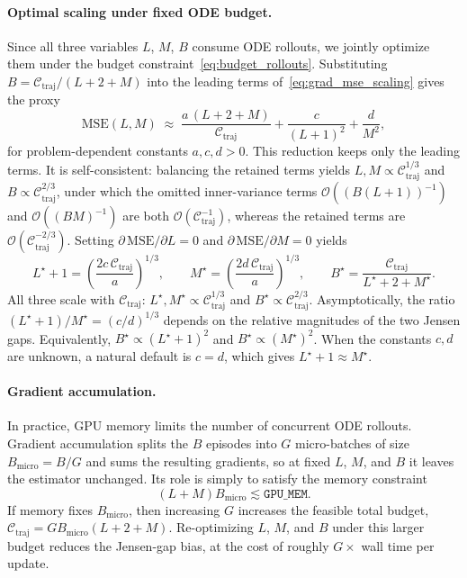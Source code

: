 \paragraph{Optimal scaling under fixed ODE budget.}
Since all three variables $L$, $M$, $B$ consume ODE rollouts, we jointly optimize them under the budget constraint~\eqref{eq:budget_rollouts}.
Substituting $B = \mathcal{C}_{\text{traj}}/(L+2+M)$ into the leading terms of~\eqref{eq:grad_mse_scaling} gives the proxy
\begin{equation}
\mathrm{MSE}(L,M) \;\approx\; \frac{a\,(L+2+M)}{\mathcal{C}_{\text{traj}}} + \frac{c}{(L+1)^2} + \frac{d}{M^2},
\end{equation}
for problem-dependent constants $a,c,d>0$.
This reduction keeps only the leading terms. It is self-consistent: balancing the retained terms yields $L,M \propto \mathcal{C}_{\text{traj}}^{1/3}$ and $B \propto \mathcal{C}_{\text{traj}}^{2/3}$, under which the omitted inner-variance terms $\mathcal{O}((B(L+1))^{-1})$ and $\mathcal{O}((BM)^{-1})$ are both $\mathcal{O}(\mathcal{C}_{\text{traj}}^{-1})$, whereas the retained terms are $\mathcal{O}(\mathcal{C}_{\text{traj}}^{-2/3})$.
Setting $\partial\,\mathrm{MSE}/\partial L = 0$ and $\partial\,\mathrm{MSE}/\partial M = 0$ yields
\begin{equation}
L^\star + 1 = \left(\frac{2c\,\mathcal{C}_{\text{traj}}}{a}\right)^{1/3}, \qquad
M^\star = \left(\frac{2d\,\mathcal{C}_{\text{traj}}}{a}\right)^{1/3}, \qquad
B^\star = \frac{\mathcal{C}_{\text{traj}}}{L^\star + 2 + M^\star}.
\end{equation}
All three scale with $\mathcal{C}_{\text{traj}}$: $L^\star, M^\star \propto \mathcal{C}_{\text{traj}}^{1/3}$ and $B^\star \propto \mathcal{C}_{\text{traj}}^{2/3}$.
Asymptotically, the ratio $(L^\star+1)/M^\star = (c/d)^{1/3}$ depends on the relative magnitudes of the two Jensen gaps.
Equivalently, $B^\star \propto (L^\star+1)^2$ and $B^\star \propto (M^\star)^2$.
When the constants $c,d$ are unknown, a natural default is $c=d$, which gives $L^\star + 1 \approx M^\star$.

\paragraph{Gradient accumulation.}
In practice, GPU memory limits the number of concurrent ODE rollouts.
Gradient accumulation splits the $B$ episodes into $G$ micro-batches of size $B_{\text{micro}} = B/G$ and sums the resulting gradients, so at fixed $L$, $M$, and $B$ it leaves the estimator unchanged. Its role is simply to satisfy the memory constraint
\begin{equation}
(L + M) B_{\text{micro}} \lesssim \texttt{GPU\_MEM}.
\end{equation}
If memory fixes $B_{\text{micro}}$, then increasing $G$ increases the feasible total budget, $\mathcal{C}_{\text{traj}} = G B_{\text{micro}} (L+2+M)$. Re-optimizing $L$, $M$, and $B$ under this larger budget reduces the Jensen-gap bias, at the cost of roughly $G\times$ wall time per update.

